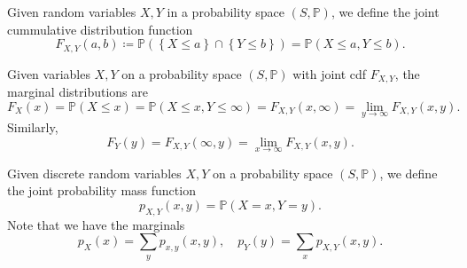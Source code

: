 \begin{definition}
    Given random variables \(X, Y\) in a probability space \((S, \mathbb{P})\), we define the joint cummulative distribution function 
    \[
        F_{X, Y} (a, b) \coloneqq \mathbb{P} \left( \left\{ X \le a \right\} \cap \left\{ Y \le b \right\}   \right) = \mathbb{P} (X \le a, Y \le b). 
    \]  
\end{definition}

\begin{definition}
    Given variables \(X, Y\) on a probability space \((S, \mathbb{P})\) with joint cdf \(F_{X,Y}\), the marginal distributions are 
    \[
        F_X(x) = \mathbb{P} (X \le x) = \mathbb{P} (X \le x, Y \le \infty) = F_{X, Y}(x, \infty) = \lim_{y \to \infty} F_{X, Y} (x, y). 
    \]   
    Similarly, 
    \[
        F_Y(y) = F_{X, Y}(\infty , y) = \lim_{x \to \infty} F_{X, Y} (x, y). 
    \]
\end{definition}

\begin{definition}
    Given discrete random variables \(X, Y\) on a probability space \((S, \mathbb{P})\), we define the joint probability mass function 
    \[
        p_{X, Y} (x, y) = \mathbb{P} (X = x, Y = y).
    \]  
    Note that we have the marginals 
    \[
        p_X(x) = \sum_{y} p_{x, y} (x, y), \quad p_Y(y) = \sum_{x} p_{X, Y} (x, y).   
    \]
\end{definition}

